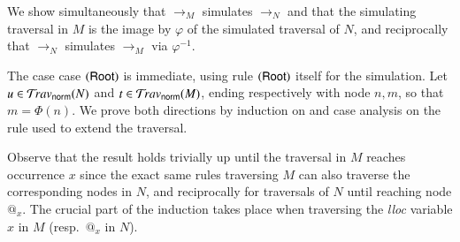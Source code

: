 \documentclass{elsarticle}
\newif\ifshortversion
\theoremstyle{plain}
\theoremstyle{definition}
\newcommand{\normalizing}{{\sf norm}}
\newcommand{\travsetnorm}{\travset_\normalizing} %
\begin{document}

We show simultaneously that $\rightarrow_M$ simulates
$\rightarrow_N$ and that the simulating traversal in $M$ is the image
by $\varphi$ of the simulated traversal of $N$, and reciprocally that
$\rightarrow_N$ simulates $\rightarrow_M$ via $\varphi^{-1}$.
%
\ifshortversion
The proof goes by induction on and case analysis on
the rule used to extend the traversal.
\else
The case case $\mathbf{({\sf Root})}$ is immediate, using rule $\mathbf{({\sf Root})}$ itself for the simulation.
%
Let $u\in \travsetnorm(N)$ and $t\in\travsetnorm(M)$,
ending respectively with node $n, m$, so that $m = \Phi(n)$.
We prove both directions by induction on
and case analysis on the rule used to
extend the traversal.

Observe that the result holds trivially up until the traversal in $M$ reaches occurrence $x$ since the exact same rules traversing $M$
can also traverse the corresponding nodes in $N$, and reciprocally for traversals of $N$ until reaching node $@_x$. The crucial part of the induction takes place when traversing the \emph{lloc} variable $x$ in $M$ (resp.~$@_x$ in $N$).
\fi
\end{document}
